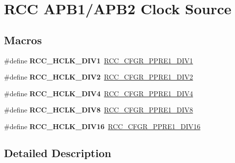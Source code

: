 \hypertarget{group___r_c_c___a_p_b1___a_p_b2___clock___source}{}\section{R\+CC A\+P\+B1/\+A\+P\+B2 Clock Source}
\label{group___r_c_c___a_p_b1___a_p_b2___clock___source}
\subsection*{Macros}
\begin{DoxyCompactItemize}
\item 
\mbox{\label{group___r_c_c___a_p_b1___a_p_b2___clock___source_ga8e3fcdef0e5d77bb61a52420fe1e9fbc}} 
\#define {\bfseries R\+C\+C\+\_\+\+H\+C\+L\+K\+\_\+\+D\+I\+V1}~\mbox{\hyperlink{group___peripheral___registers___bits___definition_gac8f6562bb2ecf65055a2f42cbb48ef11}{R\+C\+C\+\_\+\+C\+F\+G\+R\+\_\+\+P\+P\+R\+E1\+\_\+\+D\+I\+V1}}
\item 
\mbox{\label{group___r_c_c___a_p_b1___a_p_b2___clock___source_ga4d2ebcf280d85e8449a5fb7b994b5169}} 
\#define {\bfseries R\+C\+C\+\_\+\+H\+C\+L\+K\+\_\+\+D\+I\+V2}~\mbox{\hyperlink{group___peripheral___registers___bits___definition_gaf832ad6844c907d9bb37c1536defcb0d}{R\+C\+C\+\_\+\+C\+F\+G\+R\+\_\+\+P\+P\+R\+E1\+\_\+\+D\+I\+V2}}
\item 
\mbox{\label{group___r_c_c___a_p_b1___a_p_b2___clock___source_ga85b5f4fd936e22a3f4df5ed756f6e083}} 
\#define {\bfseries R\+C\+C\+\_\+\+H\+C\+L\+K\+\_\+\+D\+I\+V4}~\mbox{\hyperlink{group___peripheral___registers___bits___definition_ga0e340725f46e9462d9b02a079b9fa8ae}{R\+C\+C\+\_\+\+C\+F\+G\+R\+\_\+\+P\+P\+R\+E1\+\_\+\+D\+I\+V4}}
\item 
\mbox{\label{group___r_c_c___a_p_b1___a_p_b2___clock___source_gadb18bc60e2c639cb59244bedb54f7bb3}} 
\#define {\bfseries R\+C\+C\+\_\+\+H\+C\+L\+K\+\_\+\+D\+I\+V8}~\mbox{\hyperlink{group___peripheral___registers___bits___definition_ga9ddd6d657837e1971bb86e3bf1c15e72}{R\+C\+C\+\_\+\+C\+F\+G\+R\+\_\+\+P\+P\+R\+E1\+\_\+\+D\+I\+V8}}
\item 
\mbox{\label{group___r_c_c___a_p_b1___a_p_b2___clock___source_ga27ac27d48360121bc2dc68b99dc8845d}} 
\#define {\bfseries R\+C\+C\+\_\+\+H\+C\+L\+K\+\_\+\+D\+I\+V16}~\mbox{\hyperlink{group___peripheral___registers___bits___definition_ga5c38ba326bde7c7a18c4f7f2aacf823f}{R\+C\+C\+\_\+\+C\+F\+G\+R\+\_\+\+P\+P\+R\+E1\+\_\+\+D\+I\+V16}}
\end{DoxyCompactItemize}


\subsection{Detailed Description}
